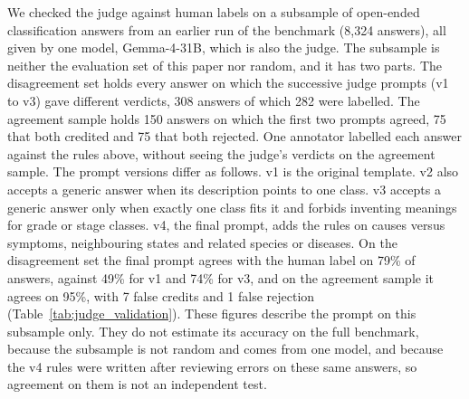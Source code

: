 \documentclass[10pt,letterpaper]{article}
\newcommand{\tablefont}{\footnotesize}
\newcommand{\newtext}[1]{#1}
\begin{document}
\newtext{We checked the judge against human labels on a subsample of open-ended classification answers from an earlier run of the benchmark (8,324 answers), all given by one model, Gemma-4-31B, which is also the judge. The subsample is neither the evaluation set of this paper nor random, and it has two parts. The disagreement set holds every answer on which the successive judge prompts (v1 to v3) gave different verdicts, 308 answers of which 282 were labelled. The agreement sample holds 150 answers on which the first two prompts agreed, 75 that both credited and 75 that both rejected. One annotator labelled each answer against the rules above, without seeing the judge's verdicts on the agreement sample. The prompt versions differ as follows. v1 is the original template. v2 also accepts a generic answer when its description points to one class. v3 accepts a generic answer only when exactly one class fits it and forbids inventing meanings for grade or stage classes. v4, the final prompt, adds the rules on causes versus symptoms, neighbouring states and related species or diseases. On the disagreement set the final prompt agrees with the human label on 79\% of answers, against 49\% for v1 and 74\% for v3, and on the agreement sample it agrees on 95\%, with 7 false credits and 1 false rejection (Table~\ref{tab:judge_validation}). These figures describe the prompt on this subsample only. They do not estimate its accuracy on the full benchmark, because the subsample is not random and comes from one model, and because the v4 rules were written after reviewing errors on these same answers, so agreement on them is not an independent test.}

\begin{table}[!tbp]
\centering
{
\caption{Agreement of the LLM-judge prompt versions with human labels on a labelled subsample of Gemma-4-31B's OEQ answers from an earlier run, not the evaluation set of this paper (Appendix~\ref{app:judge}). Cells are the answers on which the judge matches the human label (\% of the row's answers in parentheses). The disagreement set holds the answers on which prompts v1 to v3 disagreed. The agreement sample holds answers on which v1 and v2 agreed, half credited and half rejected, so v1 and v2 match on it by construction. The v4 rules were written after reviewing errors on these answers, so its agreement is not an independent test.}
\label{tab:judge_validation}
\renewcommand{\arraystretch}{1.2}
\tablefont

}
\end{table}
\end{document}
